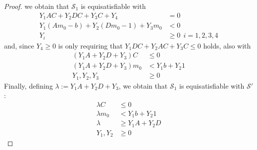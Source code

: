 \begin{proof}
we obtain that $\mathcal{S}_1$ is equisatisfiable with 
\begin{align*}
  Y_1 A C         + Y_2 D C         + Y_3 C  + Y_4    & = 0 \\
  Y_1 (A m_0 - b) + Y_2 (D m_0 - 1) + Y_3 m_0         & < 0 \\
  Y_i                               & \ge 0 \ \ i=1,2,3,4
\end{align*}
and, since $Y_4\ge 0$ is only requiring that $Y_1 D C + Y_2 A C + Y_3 C \leq 0$ holds,
also with 
\begin{align*}
  (Y_1 A + Y_2 D + Y_3) C    & \le 0          \\
  (Y_1 A + Y_2 D + Y_3) m_0  & < Y_1 b + Y_2 1 \\
  Y_1,Y_2,Y_3 & \ge 0 
\end{align*}
Finally, defining $\lambda := Y_1 A + Y_2 D + Y_3$, we obtain that
$\mathcal{S}_1$ is equisatisfiable with $\mathcal{S}'$:
\begin{align*}
  \lambda C    & \le 0             \\
  \lambda m_0  & <   Y_1 b + Y_2 1  \\
  \lambda      & \ge Y_1 A + Y_2 D  \\
  Y_1, Y_2        & \ge 0    
\end{align*}
\end{proof}
